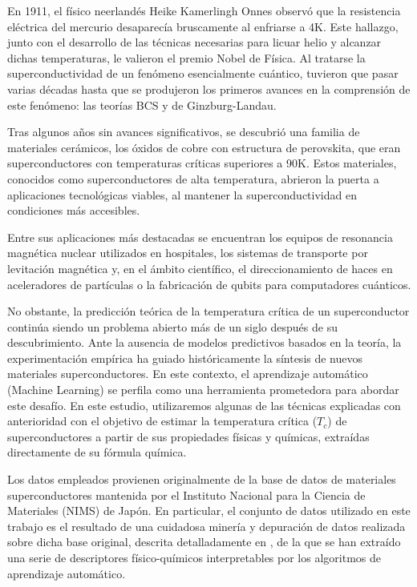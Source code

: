 \documentclass[titlepage, 11pt]{book}
\begin{document}
En 1911, el físico neerlandés Heike Kamerlingh Onnes observó que la resistencia eléctrica del mercurio desaparecía bruscamente al enfriarse a 4K. Este hallazgo, junto con el desarrollo de las técnicas necesarias para licuar helio y alcanzar dichas temperaturas, le valieron el premio Nobel de Física. Al tratarse la superconductividad de un fenómeno esencialmente cuántico, tuvieron que pasar varias décadas hasta que se produjeron los primeros avances en la comprensión de este fenómeno: las teorías BCS y de Ginzburg-Landau.

Tras algunos años sin avances significativos, se descubrió una familia de materiales cerámicos, los óxidos de cobre con estructura de perovskita, que eran superconductores con temperaturas críticas superiores a 90K. Estos materiales, conocidos como superconductores de alta temperatura, abrieron la puerta a aplicaciones tecnológicas viables, al mantener la superconductividad en condiciones más accesibles.

Entre sus aplicaciones más destacadas se encuentran los equipos de resonancia magnética nuclear utilizados en hospitales, los sistemas de transporte por levitación magnética y, en el ámbito científico, el direccionamiento de haces en aceleradores de partículas o la fabricación de qubits para computadores cuánticos.

No obstante, la predicción teórica de la temperatura crítica de un superconductor continúa siendo un problema abierto más de un siglo después de su descubrimiento. Ante la ausencia de modelos predictivos basados en la teoría, la experimentación empírica ha guiado históricamente la síntesis de nuevos materiales superconductores. En este contexto, el aprendizaje automático (Machine Learning) se perfila como una herramienta prometedora para abordar este desafío. En este estudio, utilizaremos algunas de las técnicas explicadas con anterioridad con el objetivo de estimar la temperatura crítica ($T_c$) de superconductores a partir de sus propiedades físicas y químicas, extraídas directamente de su fórmula química.

Los datos empleados provienen originalmente de la base de datos de materiales superconductores mantenida por el Instituto Nacional para la Ciencia de Materiales (NIMS) de Japón. En particular, el conjunto de datos utilizado en este trabajo es el resultado de una cuidadosa minería y depuración de datos realizada sobre dicha base original, descrita detalladamente en \cite{hamidieh2018data}, de la que se han extraído una serie de descriptores físico-químicos interpretables por los algoritmos de aprendizaje automático.
\end{document}
